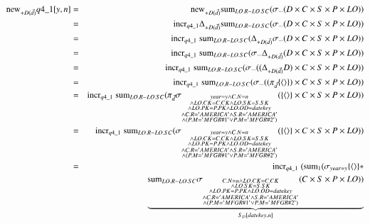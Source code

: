 \begin{eqnarray}
\mathrm{new}_{+D(\vec{d})} q4\_1[y,n] &=& \mathrm{new}_{+D(\vec{d})} \mathrm{sum}_{LO.R - LO.SC} 
  (\sigma_{\substack{ \dots}} (D \times C \times S \times P \times LO ))\\
&=& \mathrm{incr}_{q4\_1}\Delta_{+D(\vec{d})} \mathrm{sum}_{LO.R - LO.SC} 
  (\sigma_{\substack{ \dots}} (D \times C \times S \times P \times LO ))\\
&=& \mathrm{incr}_{q4\_1}\;\mathrm{sum}_{LO.R - LO.SC} 
  (\Delta_{+D(\vec{d})}  \sigma_{\substack{\dots}} (D \times C \times S \times P \times LO ))\\
&=& \mathrm{incr}_{q4\_1}\;\mathrm{sum}_{LO.R - LO.SC} 
  ( \sigma_{\substack{ \dots}} \Delta_{+D(\vec{d})}(D \times C \times S \times P \times LO ))\\
&=& \mathrm{incr}_{q4\_1}\;\mathrm{sum}_{LO.R - LO.SC} 
  ( \sigma_{\substack{ \dots}} ((\Delta_{+D(\vec{d})}D) \times C \times S \times P \times LO ))\\
&=& \mathrm{incr}_{q4\_1}\;\mathrm{sum}_{LO.R - LO.SC} 
  ( \sigma_{\substack{ \dots}} ((\pi_{\vec{d}}\{{\langle\rangle}\}) \times C \times S \times P \times LO ))\\
&=& \mathrm{incr}_{q4\_1}\;\mathrm{sum}_{LO.R - LO.SC} 
  (\pi_{\vec{d}} \sigma_{\substack{year = y \wedge C.N = n \\\wedge LO.CK = C.CK \wedge LO.SK = S.SK \\\wedge LO.PK = P.PK \wedge LO.OD = datekey \\\wedge C.R = 'AMERICA' \wedge S.R = 'AMERICA' \\\wedge ( P.M = 'MFGR\#1' \vee P.M = 'MFGR\#2')
}} ( \{{\langle\rangle}\} \times C \times S \times P \times LO ))\\
&=& \mathrm{incr}_{q4\_1}\;\mathrm{sum}_{LO.R - LO.SC} 
  ( \sigma_{\substack{year = y \wedge C.N = n \\\wedge LO.CK = C.CK \wedge LO.SK = S.SK \\\wedge LO.PK = P.PK \wedge LO.OD = datekey \\\wedge C.R = 'AMERICA' \wedge S.R = 'AMERICA' \\\wedge ( P.M = 'MFGR\#1' \vee P.M = 'MFGR\#2')
}} ( \{{\langle\rangle}\} \times C \times S \times P \times LO ))\\
&=& \mathrm{incr}_{q4\_1}\; 
  ( \mathrm{sum}_{1} (\sigma_{year = y} \{{\langle\rangle}\} * \\\nonumber&&\qquad \underbrace{\mathrm{sum}_{LO.R - LO.SC}\sigma_{\substack{C.N = n \wedge LO.CK = C.CK \\\wedge LO.SK = S.SK \\\wedge LO.PK = P.PK \wedge LO.OD = datekey \\\wedge C.R = 'AMERICA' \wedge S.R = 'AMERICA' \\\wedge ( P.M = 'MFGR\#1' \vee P.M = 'MFGR\#2')
}} ( C \times S \times P \times LO ))}_{S_{D}[datekey, n]}
\end{eqnarray}
